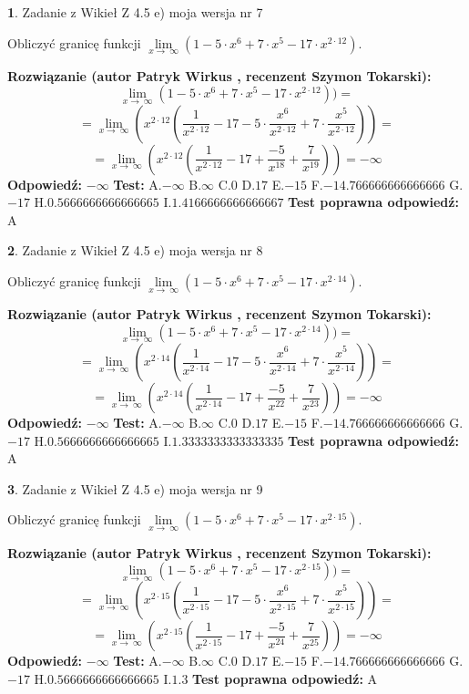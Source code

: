 \documentclass[12pt, a4paper]{article}
\theoremstyle{definition} %
\newtheorem{zad}{}
\newcommand{\zadStart}[1]{\begin{zad}#1\newline}
\newcommand{\zadStop}{\end{zad}}
\newcommand{\rozwStart}[2]{\noindent \textbf{Rozwiązanie (autor #1 , recenzent #2): }\newline}
\newcommand{\rozwStop}{\newline}
\newcommand{\odpStart}{\noindent \textbf{Odpowiedź:}\newline}
\newcommand{\odpStop}{\newline}
\newcommand{\testStart}{\noindent \textbf{Test:}\newline}
\newcommand{\testStop}{\newline}
\newcommand{\kluczStart}{\noindent \textbf{Test poprawna odpowiedź:}\newline}
\newcommand{\kluczStop}{\newline}
\begin{document}
\zadStart{Zadanie z Wikieł Z 4.5 e) moja wersja nr 7}


Obliczyć granicę funkcji  $\lim\limits_{x\to\ \infty}(1 - 5 \cdot x^{6}+7 \cdot x^{5}- 17 \cdot x^{2\cdot12})$.
\zadStop
\rozwStart{Patryk Wirkus}{Szymon Tokarski}
$$\lim\limits_{x\to\ \infty}(1 - 5 \cdot x^{6}+7 \cdot x^{5}- 17 \cdot x^{2\cdot12}))=$$
$$=\lim\limits_{x\to\ \infty}(x^{2\cdot12}(\frac{1}{x^{2\cdot12}}-17 -5 \cdot \frac{x^{6}}{x^{2\cdot12}}+7 \cdot \frac{x^{5}}{x^{2\cdot12}}))=$$
$$=\lim\limits_{x\to\ \infty}(x^{2\cdot12}(\frac{1}{x^{2\cdot12}}-17 + \frac{-5}{x^{18}}+ \frac{7}{x^{19}}))=-\infty$$
\rozwStop
\odpStart
$-\infty$
\odpStop
\testStart
A.$-\infty$ B.$\infty$ C.$0$ D.$17$ E.$-15$
F.$-14.766666666666666$ G.$-17$
H.$0.5666666666666665$
I.$1.4166666666666667$
\testStop
\kluczStart
A
\kluczStop



\zadStart{Zadanie z Wikieł Z 4.5 e) moja wersja nr 8}


Obliczyć granicę funkcji  $\lim\limits_{x\to\ \infty}(1 - 5 \cdot x^{6}+7 \cdot x^{5}- 17 \cdot x^{2\cdot14})$.
\zadStop
\rozwStart{Patryk Wirkus}{Szymon Tokarski}
$$\lim\limits_{x\to\ \infty}(1 - 5 \cdot x^{6}+7 \cdot x^{5}- 17 \cdot x^{2\cdot14}))=$$
$$=\lim\limits_{x\to\ \infty}(x^{2\cdot14}(\frac{1}{x^{2\cdot14}}-17 -5 \cdot \frac{x^{6}}{x^{2\cdot14}}+7 \cdot \frac{x^{5}}{x^{2\cdot14}}))=$$
$$=\lim\limits_{x\to\ \infty}(x^{2\cdot14}(\frac{1}{x^{2\cdot14}}-17 + \frac{-5}{x^{22}}+ \frac{7}{x^{23}}))=-\infty$$
\rozwStop
\odpStart
$-\infty$
\odpStop
\testStart
A.$-\infty$ B.$\infty$ C.$0$ D.$17$ E.$-15$
F.$-14.766666666666666$ G.$-17$
H.$0.5666666666666665$
I.$1.3333333333333335$
\testStop
\kluczStart
A
\kluczStop



\zadStart{Zadanie z Wikieł Z 4.5 e) moja wersja nr 9}


Obliczyć granicę funkcji  $\lim\limits_{x\to\ \infty}(1 - 5 \cdot x^{6}+7 \cdot x^{5}- 17 \cdot x^{2\cdot15})$.
\zadStop
\rozwStart{Patryk Wirkus}{Szymon Tokarski}
$$\lim\limits_{x\to\ \infty}(1 - 5 \cdot x^{6}+7 \cdot x^{5}- 17 \cdot x^{2\cdot15}))=$$
$$=\lim\limits_{x\to\ \infty}(x^{2\cdot15}(\frac{1}{x^{2\cdot15}}-17 -5 \cdot \frac{x^{6}}{x^{2\cdot15}}+7 \cdot \frac{x^{5}}{x^{2\cdot15}}))=$$
$$=\lim\limits_{x\to\ \infty}(x^{2\cdot15}(\frac{1}{x^{2\cdot15}}-17 + \frac{-5}{x^{24}}+ \frac{7}{x^{25}}))=-\infty$$
\rozwStop
\odpStart
$-\infty$
\odpStop
\testStart
A.$-\infty$ B.$\infty$ C.$0$ D.$17$ E.$-15$
F.$-14.766666666666666$ G.$-17$
H.$0.5666666666666665$
I.$1.3$
\testStop
\kluczStart
A
\kluczStop
\end{document}
